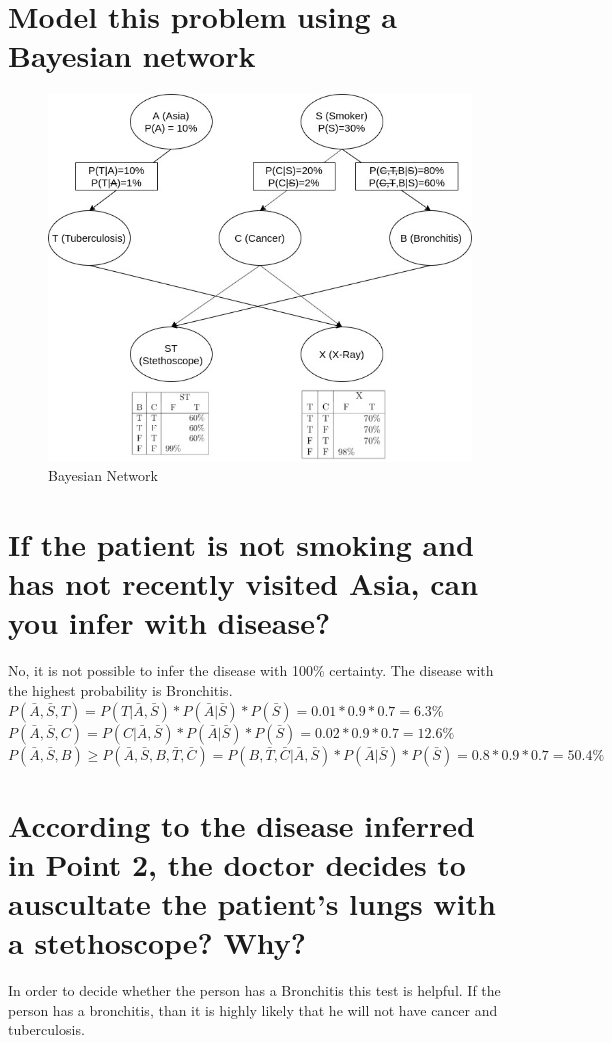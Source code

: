 \documentclass[12pt]{article}
\begin{document}
\section{Model this problem using a Bayesian network}
\begin{figure}[hbtp]
\caption{Bayesian Network}
\centering
\includegraphics[scale=.7]{network.jpg}
\end{figure}
\section{If the patient is not smoking and has not recently visited Asia, can you infer with disease?}
No, it is not possible to infer the disease with 100\% certainty. The disease with the highest probability is Bronchitis.\\
$P(\bar{A}, \bar{S}, T) = P(T|\bar{A},\bar{S}) * P(\bar{A}|\bar{S}) * P(\bar{S}) = 0.01 * 0.9 * 0.7 = 6.3\%$\\
$P(\bar{A}, \bar{S}, C) = P(C|\bar{A},\bar{S}) * P(\bar{A}|\bar{S}) * P(\bar{S}) = 0.02* 0.9 * 0.7 = 12.6\%$\\
$P(\bar{A}, \bar{S}, B) \geq P(\bar{A}, \bar{S}, B, \bar{T}, \bar{C}) = P(B,\bar{T}, \bar{C} |\bar{A},\bar{S}) * P(\bar{A}|\bar{S}) * P(\bar{S}) = 0.8 * 0.9 * 0.7 = 50.4\%$\\
\section{According to the disease inferred in Point 2, the doctor decides to auscultate the patient's lungs with a stethoscope? Why?}
In order to decide whether the person has a Bronchitis this test is helpful. If the person has a bronchitis, than it is highly likely that he will not have cancer and tuberculosis.\\
\end{document}

